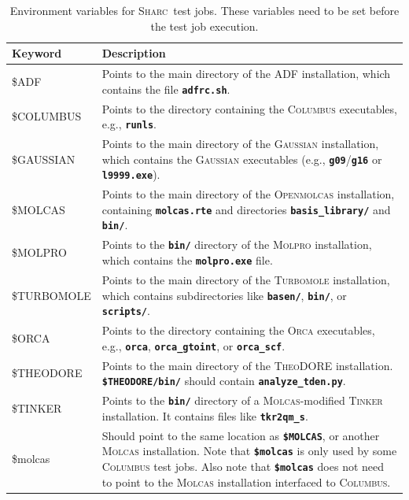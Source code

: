 \documentclass[a4paper,10pt,DIV=15,openany]{scrbook}
\newcommand{\sharc}{\textsc{Sharc}}
\newcommand{\ttt}[1]{\textbf{\texttt{#1}}}
\begin{document}
\begin{table}
  \centering
  \caption[Environment variables for \sharc\ test jobs.]{Environment variables for \sharc\ test jobs. These variables need to be set before the test job execution.}
  \label{tab:test_vars}
  \begin{tabular}{>{\ttfamily}lp{13cm}}
  \hline
  Keyword       &Description\\
  \hline
  \$ADF         &Points to the main directory of the ADF installation, which contains the file \ttt{adfrc.sh}.\\
  \$COLUMBUS    &Points to the directory containing the \textsc{Columbus} executables, e.g., \ttt{runls}.\\
  \$GAUSSIAN    &Points to the main directory of the \textsc{Gaussian} installation, which contains the \textsc{Gaussian} executables (e.g., \ttt{g09}/\ttt{g16} or \ttt{l9999.exe}).\\
  \$MOLCAS      &Points to the main directory of the \textsc{Openmolcas} installation, containing \ttt{molcas.rte} and directories \ttt{basis\_library/} and \ttt{bin/}.\\
  \$MOLPRO      &Points to the \ttt{bin/} directory of the \textsc{Molpro} installation, which contains the \ttt{molpro.exe} file.\\
  \$TURBOMOLE   &Points to the main directory of the \textsc{Turbomole} installation, which contains subdirectories like \ttt{basen/}, \ttt{bin/}, or \ttt{scripts/}.\\
  \$ORCA        &Points to the directory containing the \textsc{Orca} executables, e.g., \ttt{orca}, \ttt{orca\_gtoint}, or \ttt{orca\_scf}.\\
  \$THEODORE    &Points to the main directory of the \textsc{TheoDORE} installation. \ttt{\$THEODORE/bin/} should contain \ttt{analyze\_tden.py}.\\
  \$TINKER      &Points to the \ttt{bin/} directory of a \textsc{Molcas}-modified \textsc{Tinker} installation. It contains files like \ttt{tkr2qm\_s}.\\
  \$molcas      &Should point to the same location as \ttt{\$MOLCAS}, or another \textsc{Molcas} installation. Note that \ttt{\$molcas} is only used by some \textsc{Columbus} test jobs. Also note that \ttt{\$molcas} does not need to point to the \textsc{Molcas} installation interfaced to \textsc{Columbus}.\\
  \hline
  \end{tabular}
\end{table}
\end{document}
